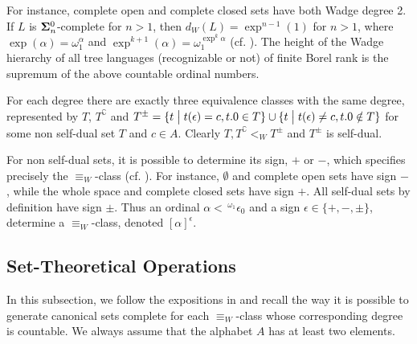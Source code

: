 For instance, complete open and complete closed sets have both Wadge degree 2. %
If $L$ is ${\bf
  \Sigma}^0_n$-complete for $n>1$, then $d_W(L) = \exp^{n-1}(1)$ for $n>1$, where $\exp(\alpha) = \omega_1^\alpha$ and $\exp^{k+1}(\alpha) = \omega_1^{\exp^k{\alpha}}$ (cf. \cite{dup1}). The
height of the Wadge hierarchy of all tree languages (recognizable or
not) of finite Borel rank is the supremum of the above countable ordinal numbers. %

For each degree there are exactly three equivalence
classes with the same degree, represented by $T$, $T^\complement$ and
$T^\pm = \{t \bigm | t(\epsilon) = c, t.0\in T \} \cup  \{t \bigm |
t(\epsilon) \neq c, t.0\notin T \}$ for some non self-dual set $T$ and
$c\in A$. Clearly $T, T^\complement <_W T^\pm$ and
$T^\pm$ is self-dual.

For non self-dual sets, it is possible to determine its sign, $+$
or $-$, which specifies precisely the $\equiv_W$-class
(cf. \cite{dup1}). 
For instance, $\emptyset$ and complete open sets have sign $-$, while the whole space and complete closed  sets have sign $+$.
  All self-dual sets by
definition have sign $\pm$. Thus an ordinal $\alpha <\,
{}^{\omega_1}\epsilon_0$ and a sign $\epsilon \in \{+,-,\pm\}$,
determine a $\equiv_W$-class, denoted  $[\alpha]^\epsilon$. 



\subsection{Set-Theoretical Operations}
In this subsection, we follow the expositions in \cite{dup1,dup3} and recall the way it is possible to generate canonical sets complete for each $\equiv_W$-class whose corresponding degree is countable. We always assume that the alphabet $A$ has at least two elements.

